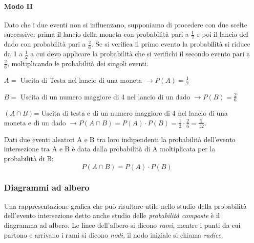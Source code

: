 \begin{esempio}
\paragraph{Modo II} Dato che i due eventi non si influenzano, supponiamo 
di procedere con due scelte successive: prima il lancio della moneta con 
probabilità pari a \(\frac 1 2\) e poi il lancio del dado con probabilità 
pari a 
\(\frac 2 6\). Se si verifica il primo evento la probabilità si riduce da 1 a 
\(\frac 1 2\) a cui devo applicare la probabilità che si verifichi il secondo 
evento pari a \(\frac 2 6\), moltiplicando le probabilità dei singoli eventi.
\begin{itemize*}
\item \( A = \) Uscita di Testa nel lancio di una moneta \(\to P(A)=\frac 1 2\)
\item \( B = \) Uscita di un numero maggiore di 4 nel lancio di un dado \(\to 
P(B)=\frac 2 6\)
\item \((A\cap B)\)= Uscita di testa e di un numero maggiore di 4 nel lancio 
di 
una moneta e di un dado \(\to P(A\cap B)=P(A)\cdot P(B)=\frac 1 2\cdot \frac 
2 
6=\frac 2{12}\).
\end{itemize*}
\end{esempio}

\begin{teorema}
Dati due eventi aleatori A e B tra loro indipendenti la 
probabilità dell'evento intersezione tra A e B è data dalla probabilità di 
A 
moltiplicata per la probabilità di B: \[P(A\cap B)=P(A)\cdot P(B)\]
\end{teorema}

\subsubsection*{Diagrammi ad albero}
Una rappresentazione grafica che può risultare utile nello studio della 
probabilità dell'evento intersezione detto anche studio delle 
\emph{probabilità composte} è il diagramma ad albero. Le linee dell'albero 
si dicono \emph{rami}, 
mentre i punti da cui partono e arrivano i rami si dicono \emph{nodi,} il 
nodo iniziale si chiama \emph{radice}.

